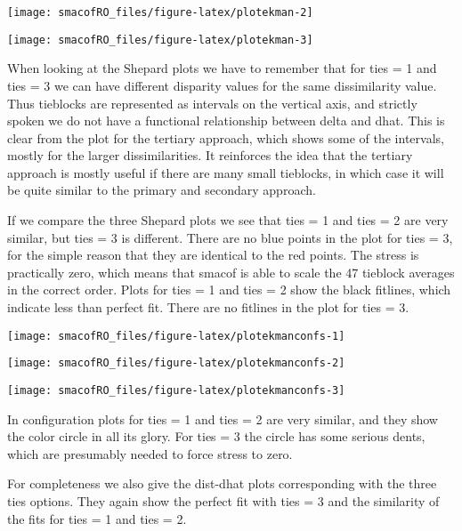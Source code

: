 \documentclass[
  12pt,
]{article}
\begin{document}
\begin{center}\texttt{[image: smacofRO\_files/figure-latex/plotekman-2]} \end{center}

\begin{center}\texttt{[image: smacofRO\_files/figure-latex/plotekman-3]} \end{center}

When looking at the
Shepard plots we have to remember that for ties = 1 and ties = 3 we can have different disparity values for the
same dissimilarity value. Thus tieblocks are represented as intervals on the vertical axis, and strictly spoken we do not have a functional relationship between delta and dhat. This is clear from the plot for the
tertiary approach, which shows some of the intervals, mostly for the larger dissimilarities. It reinforces the
idea that the tertiary approach is mostly useful if there are many small tieblocks, in which case it will be quite similar to the primary and secondary approach.

If we compare the three Shepard plots we see that ties = 1 and ties = 2 are very similar, but ties = 3
is different. There are no blue points in the plot for ties = 3, for the simple reason that they are
identical to the red points. The stress is practically zero, which means that smacof is able to scale
the 47 tieblock averages in the correct order. Plots for ties = 1 and ties = 2
show the black fitlines, which indicate less than perfect fit. There are no fitlines in the plot for ties = 3.

\begin{center}\texttt{[image: smacofRO\_files/figure-latex/plotekmanconfs-1]} \end{center}

\begin{center}\texttt{[image: smacofRO\_files/figure-latex/plotekmanconfs-2]} \end{center}

\begin{center}\texttt{[image: smacofRO\_files/figure-latex/plotekmanconfs-3]} \end{center}

In configuration plots for ties = 1 and ties = 2 are very similar, and they show
the color circle in all its glory. For ties = 3 the circle has some serious dents,
which are presumably needed to force stress to zero.

For completeness we also give the dist-dhat plots corresponding with the
three ties options. They again show the perfect fit with ties = 3 and the
similarity of the fits for ties = 1 and ties = 2.
\end{document}
